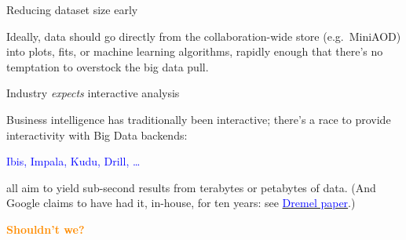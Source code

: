 \documentclass{beamer}
\begin{document}
\begin{frame}{Reducing dataset size early}
\begin{center}
\end{center}

Ideally, data should go directly from the collaboration-wide store (e.g.\ MiniAOD) into plots, fits, or machine learning algorithms, rapidly enough that there's no temptation to overstock the big data pull.
\end{frame}

\begin{frame}{Industry {\it expects} interactive analysis}

Business intelligence has traditionally been interactive; there's a race to provide interactivity with Big Data backends:

\begin{center}
\textcolor{blue}{Ibis, Impala, Kudu, Drill, \ldots}
\end{center}

all aim to yield sub-second results from terabytes or petabytes of data. (And Google claims to have had it, in-house, for ten years: see \href{http://research.google.com/pubs/pub36632.html}{\textcolor{blue}{Dremel paper}}.)

\vfill
\textcolor{darkorange}{\bf Shouldn't we?}
\end{frame}
\end{document}
